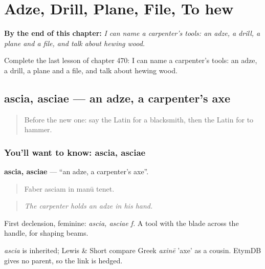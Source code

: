 
\chapter{Adze, Drill, Plane, File, To hew}
\label{ch:la-adze-drill-plane-file-to-hew}

\begin{chapteropening}
\textbf{By the end of this chapter:} \emph{I can name a carpenter's tools: an adze, a drill, a plane and a file, and talk about hewing wood.}

Complete the last lesson of chapter 470: I can name a carpenter's tools: an adze, a drill, a plane and a file, and talk about hewing wood.
\end{chapteropening}

\section[ascia, asciae]{ascia, asciae — an adze, a carpenter's axe}

\label{lesson:LA-C470-ascia}



\begin{quote}
Before the new one: say the Latin for a blacksmith, then the Latin for to hammer.
\end{quote}

\subsection*{You'll want to know: ascia, asciae}
\textbf{ascia, asciae} — \textquotedblleft{}an adze, a carpenter's axe\textquotedblright{}.

\begin{quote}
Faber asciam in manū tenet.
\end{quote}

\begin{quote}
\emph{The carpenter holds an adze in his hand.}
\end{quote}

First declension, feminine: \emph{ascia, asciae f.} A tool with the blade across the handle, for shaping beams.

\begin{cousinweb}
\emph{ascia} is inherited; Lewis \& Short compare Greek \emph{axinē} 'axe' as a cousin. EtymDB gives no parent, so the link is hedged.
\end{cousinweb}

